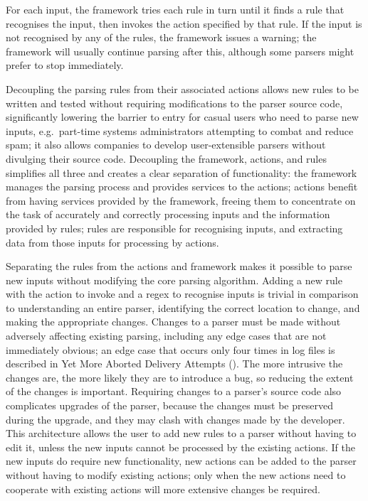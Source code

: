 For each input, the framework tries each rule in turn until it finds a rule
that recognises the input, then invokes the action specified by that rule.
If the input is not recognised by any of the rules, the framework issues a
warning; the framework will usually continue parsing after this, although
some parsers might prefer to stop immediately.

Decoupling the parsing rules from their associated actions allows new rules
to be written and tested without requiring modifications to the parser
source code, significantly lowering the barrier to entry for casual users
who need to parse new inputs, e.g.\ part-time systems administrators
attempting to combat and reduce spam; it also allows companies to develop
user-extensible parsers without divulging their source code.  Decoupling
the framework, actions, and rules simplifies all three and creates a clear
separation of functionality: the framework manages the parsing process and
provides services to the actions; actions benefit from having services
provided by the framework, freeing them to concentrate on the task of
accurately and correctly processing inputs and the information provided by
rules; rules are responsible for recognising inputs, and extracting data
from those inputs for processing by actions.

Separating the rules from the actions and framework makes it possible to
parse new inputs without modifying the core parsing algorithm.  Adding a
new rule with the action to invoke and a regex to recognise inputs is
trivial in comparison to understanding an entire parser, identifying the
correct location to change, and making the appropriate changes.  Changes to
a parser must be made without adversely affecting existing parsing,
including any edge cases that are not immediately obvious; an edge case
that occurs only four times in \numberOFlogFILES{} log files is described
in Yet More Aborted Delivery Attempts ().  The more intrusive the changes are, the more likely
they are to introduce a bug, so reducing the extent of the changes is
important.  Requiring changes to a parser's source code also complicates
upgrades of the parser, because the changes must be preserved during the
upgrade, and they may clash with changes made by the developer.  This
architecture allows the user to add new rules to a parser without having to
edit it, unless the new inputs cannot be processed by the existing actions.
If the new inputs do require new functionality, new actions can be added to
the parser without having to modify existing actions; only when the new
actions need to cooperate with existing actions will more extensive changes
be required.

